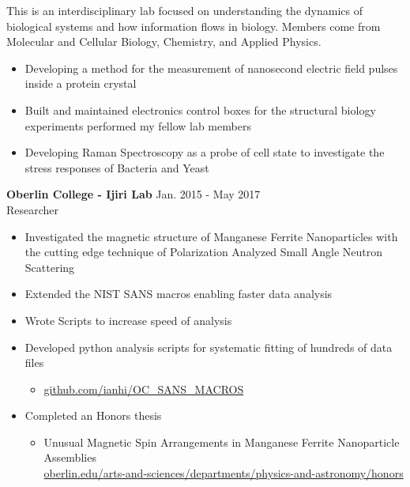 \documentclass[margin]{res}
\begin{document}
\begin{resume}
	This is an interdisciplinary lab focused on understanding the dynamics of biological systems and how information flows in biology. Members come from Molecular and Cellular Biology, Chemistry, and Applied Physics.
	\begin{itemize} \itemsep -2pt  %
		\item Developing a method for the measurement of nanosecond electric field pulses inside a protein crystal                                                                                                                                                                                                                                                                                                                                                                                                                                                                                                          
		\item Built and maintained electronics control boxes for the structural biology experiments performed my fellow lab members
		\item Developing Raman Spectroscopy as a probe of cell state to investigate the stress responses of Bacteria and Yeast
	\end{itemize}
	{\bf Oberlin College - Ijiri Lab} \hfill Jan. 2015 - May 2017 \\
	Researcher
	\begin{itemize} \itemsep -2pt  %
		\item Investigated the magnetic structure of Manganese Ferrite Nanoparticles with the cutting edge technique of Polarization Analyzed Small Angle Neutron Scattering
		\item Extended the NIST SANS macros enabling faster data analysis
		\item Wrote Scripts to increase speed of analysis 
		\item Developed python analysis scripts for systematic fitting of hundreds of data files
			\begin{itemize}
				\item \url{github.com/ianhi/OC\_SANS\_MACROS}
			\end{itemize}
		\item Completed an Honors thesis
			\begin{itemize}
				\item Unusual Magnetic Spin Arrangements in Manganese Ferrite Nanoparticle Assemblies\\ \small\url{oberlin.edu/arts-and-sciences/departments/physics-and-astronomy/honors}\normalsize
			\end{itemize} 
	\end{itemize}


\end{resume}
\end{document}
